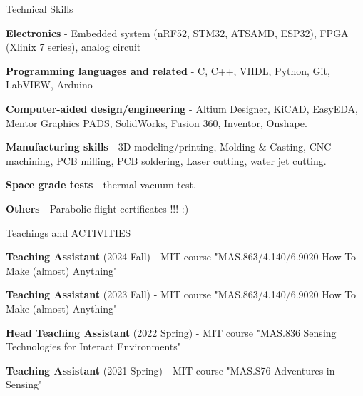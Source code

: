 \documentclass{resume} %
\begin{document}
\begin{rSection}{Technical Skills}

\begin{itemlabel}

\item \textbf{Electronics} - Embedded system (nRF52, STM32, ATSAMD, ESP32), FPGA (Xlinix 7 series), analog circuit
\smallskip
\smallskip

\item \textbf{Programming languages and related} - C, C++, VHDL, Python, Git, LabVIEW, Arduino
\smallskip
\smallskip

\item \textbf{Computer-aided design/engineering} - Altium Designer, KiCAD, EasyEDA, Mentor Graphics PADS, SolidWorks, Fusion 360, Inventor, Onshape.
\smallskip
\smallskip

\item \textbf{Manufacturing skills} - 3D modeling/printing, Molding \& Casting, CNC machining, PCB milling, PCB soldering, Laser cutting, water jet cutting.
\smallskip
\smallskip

\item \textbf{Space grade tests} - thermal vacuum test.
\smallskip
\smallskip

\item \textbf{Others} - Parabolic flight certificates !!! :)
\smallskip
\smallskip

\end{itemlabel}
\end{rSection}

\begin{rSection}{Teachings and ACTIVITIES}

\begin{itemlabel}
\item \textbf{Teaching Assistant} (2024 Fall) - MIT course "MAS.863/4.140/6.9020 How To Make (almost) Anything"
\smallskip
\smallskip

\item \textbf{Teaching Assistant} (2023 Fall) - MIT course "MAS.863/4.140/6.9020 How To Make (almost) Anything"
\smallskip
\smallskip

\item \textbf{Head Teaching Assistant} (2022 Spring) - MIT course "MAS.836 Sensing Technologies for Interact Environments"
\smallskip
\smallskip

\item \textbf{Teaching Assistant} (2021 Spring) - MIT course "MAS.S76 Adventures in Sensing"

\end{itemlabel}
\end{rSection}
\end{document}
